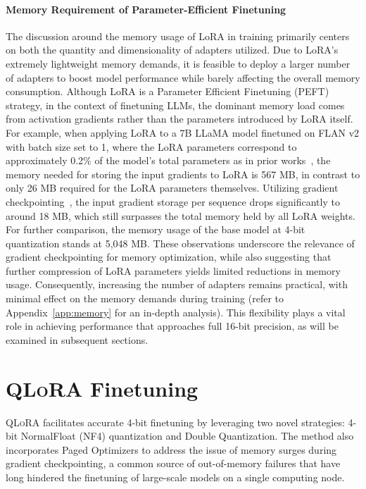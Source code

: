 \paragraph{Memory Requirement of Parameter-Efficient Finetuning} The discussion around the memory usage of LoRA in training primarily centers on both the quantity and dimensionality of adapters utilized. Due to LoRA's extremely lightweight memory demands, it is feasible to deploy a larger number of adapters to boost model performance while barely affecting the overall memory consumption. Although LoRA is a Parameter Efficient Finetuning (PEFT) strategy, in the context of finetuning LLMs, the dominant memory load comes from activation gradients rather than the parameters introduced by LoRA itself. For example, when applying LoRA to a 7B LLaMA model finetuned on FLAN v2 with batch size set to 1, where the LoRA parameters correspond to approximately 0.2\% of the model's total parameters as in prior works~\citep{hu2021lora,liu2022few}, the memory needed for storing the input gradients to LoRA is 567 MB, in contrast to only 26 MB required for the LoRA parameters themselves. Utilizing gradient checkpointing~\citep{chen2016training}, the input gradient storage per sequence drops significantly to around 18 MB, which still surpasses the total memory held by all LoRA weights. For further comparison, the memory usage of the base model at 4-bit quantization stands at 5,048 MB. These observations underscore the relevance of gradient checkpointing for memory optimization, while also suggesting that further compression of LoRA parameters yields limited reductions in memory usage. Consequently, increasing the number of adapters remains practical, with minimal effect on the memory demands during training (refer to Appendix~\ref{app:memory} for an in-depth analysis). This flexibility plays a vital role in achieving performance that approaches full 16-bit precision, as will be examined in subsequent sections.

\section{\textsc{QLoRA} Finetuning}

\textsc{QLoRA} facilitates accurate 4-bit finetuning by leveraging two novel strategies: 4-bit NormalFloat (NF4) quantization and Double Quantization. The method also incorporates Paged Optimizers to address the issue of memory surges during gradient checkpointing, a common source of out-of-memory failures that have long hindered the finetuning of large-scale models on a single computing node.

